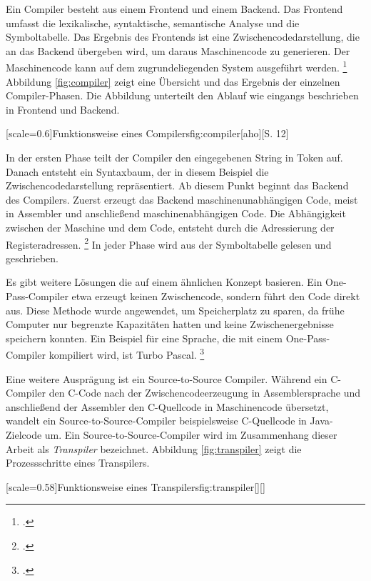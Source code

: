 Ein Compiler besteht aus einem Frontend und einem Backend. Das Frontend umfasst die lexikalische, syntaktische, semantische Analyse und die Symboltabelle.
Das Ergebnis des Frontends ist eine Zwischencodedarstellung, die an das Backend übergeben wird, um daraus Maschinencode zu generieren. Der Maschinencode kann auf dem zugrundeliegenden System ausgeführt werden. \footcite[Vgl. ][S.106ff. ]{aho}
Abbildung \ref{fig:compiler} zeigt eine Übersicht und das Ergebnis der einzelnen Compiler-Phasen. Die Abbildung unterteilt den Ablauf wie eingangs beschrieben in Frontend und Backend.

[scale=0.6]{Funktionsweise eines Compilers}{fig:compiler}[aho][S. 12]

In der ersten Phase teilt der Compiler den eingegebenen String in Token auf. Danach entsteht ein Syntaxbaum, der in diesem Beispiel die Zwischencodedarstellung repräsentiert. Ab diesem Punkt beginnt das Backend des Compilers. Zuerst erzeugt das Backend maschinenunabhängigen Code, meist in Assembler und anschließend maschinenabhängigen Code. Die Abhängigkeit zwischen der Maschine und dem Code, entsteht durch die Adressierung der Registeradressen.  \footcite[Vgl. ][S.30ff. ]{aho}
In jeder Phase wird aus der Symboltabelle gelesen und geschrieben.

Es gibt weitere Lösungen die auf einem ähnlichen Konzept basieren.
Ein One-Pass-Compiler etwa erzeugt keinen Zwischencode, sondern führt den Code direkt aus. Diese Methode wurde angewendet, um Speicherplatz zu sparen, da frühe Computer nur begrenzte Kapazitäten hatten und keine Zwischenergebnisse speichern konnten. Ein Beispiel für eine Sprache, die mit einem One-Pass-Compiler kompiliert wird, ist Turbo Pascal. \footcite[Vgl. ][]{onepass}

Eine weitere Ausprägung ist ein Source-to-Source Compiler.
Während ein C-Compiler den C-Code nach der Zwischencodeerzeugung in Assemblersprache und anschließend der Assembler den C-Quellcode in Maschinencode übersetzt, wandelt ein Source-to-Source-Compiler beispielsweise C-Quellcode in Java-Zielcode um. 
Ein Source-to-Source-Compiler wird im Zusammenhang dieser Arbeit als \emph{Transpiler} bezeichnet. Abbildung \ref{fig:transpiler} zeigt die Prozessschritte eines Transpilers.

[scale=0.58]{Funktionsweise eines Transpilers}{fig:transpiler}[][]
\pagebreak

